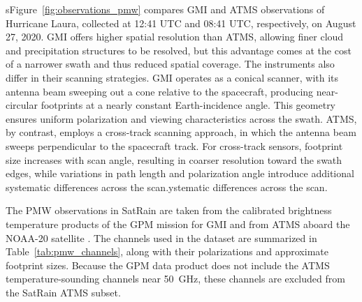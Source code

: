 \documentclass[11pt]{article}
\begin{document}
sFigure~\ref{fig:observations_pmw} compares GMI and ATMS observations of
Hurricane Laura, collected at 12:41 UTC and 08:41 UTC, respectively, on August
27, 2020. GMI offers higher spatial resolution than ATMS, allowing finer cloud
and precipitation structures to be resolved, but this advantage comes at the
cost of a narrower swath and thus reduced spatial coverage. The instruments also
differ in their scanning strategies. GMI operates as a conical scanner, with its
antenna beam sweeping out a cone relative to the spacecraft, producing
near-circular footprints at a nearly constant Earth-incidence angle. This
geometry ensures uniform polarization and viewing characteristics across the
swath. ATMS, by contrast, employs a cross-track scanning approach, in which the
antenna beam sweeps perpendicular to the spacecraft track. For cross-track
sensors, footprint size increases with scan angle, resulting in coarser
resolution toward the swath edges, while variations in path length and
polarization angle introduce additional systematic differences across the
scan.ystematic differences across the scan.

The PMW observations in SatRain are taken from the calibrated brightness
temperature products of the GPM mission for GMI \citep{Berg2022_GMI_L1C_R_V07}
and from ATMS aboard the NOAA-20 satellite \citep{Berg2022_ATMS_NOAA20_1C_V07}.
The channels used in the dataset are summarized in Table~\ref{tab:pmw_channels},
along with their polarizations and approximate footprint sizes. Because the GPM
data product does not include the ATMS temperature-sounding channels near
\SI{50}{\giga\hertz}, these channels are excluded from the SatRain ATMS
subset.
\end{document}
